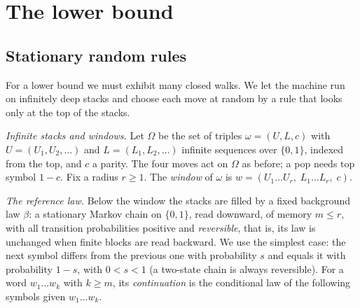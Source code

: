 \section{The lower bound}\label{sec:lower}

\subsection{Stationary random rules}

For a lower bound we must exhibit many closed walks. We let the machine run on infinitely deep stacks and choose
each move at random by a rule that looks only at the top of the stacks.

\emph{Infinite stacks and windows.} Let $\Omega$ be the set of triples $\omega=(U,L,c)$ with $U=(U_1,U_2,\ldots)$ and
$L=(L_1,L_2,\ldots)$ infinite sequences over $\{0,1\}$, indexed from the top, and $c$ a parity. The four moves act
on $\Omega$ as before; a pop needs top symbol $1-c$. Fix a radius $r\ge1$. The \emph{window} of $\omega$ is
$w=(U_1\ldots U_r,\;L_1\ldots L_r,\;c)$.

\emph{The reference law.} Below the window the stacks are filled by a fixed background law $\beta$: a stationary
Markov chain on $\{0,1\}$, read downward, of memory $m\le r$, with all transition probabilities positive and
\emph{reversible}, that is, its law is unchanged when finite blocks are read backward. We use the simplest case: the
next symbol differs from the previous one with probability $s$ and equals it with probability $1-s$, with $0<s<1$
(a two-state chain is always reversible). For a word $w_1\ldots w_k$ with $k\ge m$, its \emph{continuation} is the
conditional law of the following symbols given $w_1\ldots w_k$.

